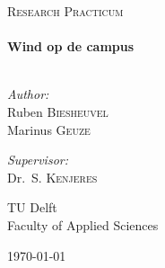 \begin{titlepage}
\begin{center}



\textsc{\Large Research Practicum}\\[0.5cm]

\HRule \\[0.4cm]
{ \huge \bfseries Wind op de campus}\\[0.4cm]

\HRule \\[1.5cm]

\begin{minipage}{0.45\textwidth}
\begin{flushleft} \large
\emph{Author:}\\
Ruben \textsc{Biesheuvel}\\
Marinus \textsc{Geuze}
\end{flushleft}
\end{minipage}
\begin{minipage}{0.45\textwidth}
\begin{flushright} \large
\emph{Supervisor:} \\
Dr.~S. \textsc{Kenjeres}

\end{flushright}
\end{minipage}

\vfill

\begin{minipage}{0.45\textwidth}
\begin{flushleft}
{\large TU Delft}\\
{\normalsize Faculty of Applied Sciences}
\end{flushleft}
\end{minipage}
\begin{minipage}{0.45\textwidth}
\begin{flushright}
{\large \today}
\end{flushright}
\end{minipage}




\end{center}
\end{titlepage}